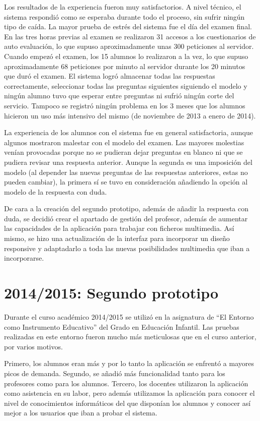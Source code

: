 Los resultados de la experiencia fueron muy satisfactorios. A nivel técnico, el sistema respondió como se esperaba durante todo el proceso, sin sufrir ningún tipo de caída. La mayor prueba de estrés del sistema fue el día del examen final. En las tres horas previas al examen se realizaron 31 accesos a los cuestionarios de auto evaluación, lo que supuso aproximadamente unas 300 peticiones al servidor. Cuando empezó el examen, los 15 alumnos lo realizaron a la vez, lo que supuso aproximadamente 68 peticiones por minuto al servidor durante los 20 minutos que duró el examen. El sistema logró almacenar todas las respuestas correctamente, seleccionar todas las preguntas siguientes siguiendo el modelo y ningún alumno tuvo que esperar entre preguntas ni sufrió ningún corte del servicio. Tampoco se registró ningún problema en los 3 meses que los alumnos hicieron un uso más intensivo del mismo (de noviembre de 2013 a enero de 2014).

La experiencia de los alumnos con el sistema fue en general satisfactoria, aunque algunos mostraron malestar con el modelo del examen. Las mayores molestias venían provocadas porque no se pudieran dejar preguntas en blanco ni que se pudiera revisar una respuesta anterior. Aunque la segunda es una imposición del modelo (al depender las nuevas preguntas de las respuestas anteriores, estas no pueden cambiar), la primera sí se tuvo en consideración añadiendo la opción al modelo de la respuesta con duda.

De cara a la creación del segundo prototipo, además de añadir la respuesta con duda, se decidió crear el apartado de gestión del profesor, además de aumentar las capacidades de la aplicación para trabajar con ficheros multimedia. Así mismo, se hizo una actualización de la interfaz para incorporar un diseño responsive y adaptadarlo a toda las nuevas posibilidades multimedia que iban a incorporarse.

\section{2014/2015: Segundo prototipo}

Durante el curso académico 2014/2015 se utilizó en la asignatura de ``El Entorno como Instrumento Educativo'' del Grado en Educación Infantil. Las pruebas realizadas en este entorno fueron mucho más meticulosas que en el curso anterior, por varios motivos. 

Primero, los alumnos eran más y por lo tanto la aplicación se enfrentó a mayores picos de demanda. Segundo, se añadió más funcionalidad tanto para los profesores como para los alumnos. Tercero, los docentes utilizaron la aplicación como asistencia en su labor, pero además utilizamos la aplicación para conocer el nivel de conocimientos informáticos del que disponían los alumnos y conocer así mejor a los usuarios que iban a probar el sistema.



